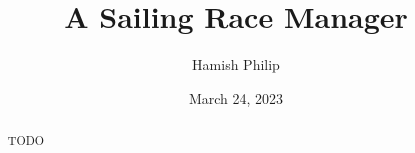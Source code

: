 \documentclass{l4proj}
\begin{document}
\title{A Sailing Race Manager}
\author{Hamish Philip}
\date{March 24, 2023}

\maketitle

\begin{abstract}
    TODO
\end{abstract}


%
%
\def\consentname {Hamish Philip} %
\def\consentdate {March 24, 2023} %
%
\educationalconsent


\tableofcontents

%
%
%
%
%
%
%
%
\end{document}
